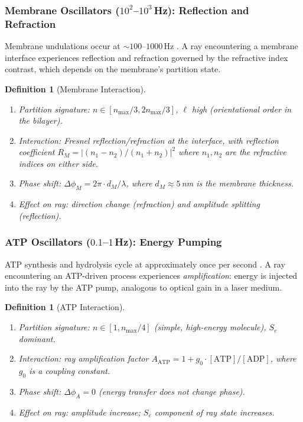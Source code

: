 \documentclass[11pt,twocolumn,a4paper]{article}
\newtheorem{definition}[theorem]{Definition}
\newcommand{\Se}{S_e}
\begin{document}
\subsubsection{Membrane Oscillators ($10^{2}$--$10^{3}$\,Hz):
Reflection and Refraction}

Membrane undulations occur at $\sim\!100$--$1000$\,Hz
\citep{singer1972}. A ray encountering a membrane interface
experiences reflection and refraction governed by the refractive index
contrast, which depends on the membrane's partition state.

\begin{definition}[Membrane Interaction]
\label{def:membrane-interaction}
\begin{enumerate}[label=(\alph*),leftmargin=*]
\item \textit{Partition signature:} $n \in [n_{\max}/3, 2n_{\max}/3]$,
  $\ell$ high (orientational order in the bilayer).
\item \textit{Interaction:} Fresnel reflection/refraction at the
  interface, with reflection coefficient $R_M = |(n_1 - n_2)/(n_1 +
  n_2)|^2$ where $n_1, n_2$ are the refractive indices on either side.
\item \textit{Phase shift:} $\Delta\phi_M = 2\pi \cdot d_M / \lambda$,
  where $d_M \approx 5$\,nm is the membrane thickness.
\item \textit{Effect on ray:} direction change (refraction) and
  amplitude splitting (reflection).
\end{enumerate}
\end{definition}

\subsubsection{ATP Oscillators ($0.1$--$1$\,Hz): Energy Pumping}

ATP synthesis and hydrolysis cycle at approximately once per second
\citep{mitchell1961}. A ray encountering an ATP-driven process
experiences \emph{amplification}: energy is injected into the ray by
the ATP pump, analogous to optical gain in a laser medium.

\begin{definition}[ATP Interaction]
\label{def:atp-interaction}
\begin{enumerate}[label=(\alph*),leftmargin=*]
\item \textit{Partition signature:} $n \in [1, n_{\max}/4]$ (simple,
  high-energy molecule), $\Se$ dominant.
\item \textit{Interaction:} ray amplification factor
  $A_{\mathrm{ATP}} = 1 + g_0 \cdot [\text{ATP}]/[\text{ADP}]$,
  where $g_0$ is a coupling constant.
\item \textit{Phase shift:} $\Delta\phi_A = 0$ (energy transfer does
  not change phase).
\item \textit{Effect on ray:} amplitude increase; $\Se$ component of
  ray state increases.
\end{enumerate}
\end{definition}
\end{document}

